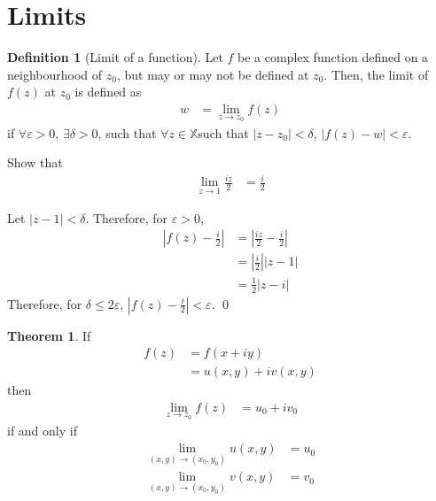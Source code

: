 \documentclass[fleqn, a4paper, 12pt, twoside]{article}
\theoremstyle{definition}
\newtheorem{definition}{Definition}
\theoremstyle{theorem}
\newtheorem{theorem}{Theorem}
\begin{document}
\section{Limits}

\begin{definition}[Limit of a function]
	Let $f$ be a complex function defined on a neighbourhood of $z_0$, but may or may not be defined at $z_0$.
	Then, the limit of $f(z)$ at $z_0$ is defined as
	\begin{align*}
		w & = \lim\limits_{z \to z_0} f(z)
	\end{align*}
	if $\forall \varepsilon > 0$, $\exists \delta > 0$, such that $\forall z \in \mathbb{X}$such that $|z - z_0| < \delta$, $\left| f(z) - w \right| < \varepsilon$.
\end{definition}

\begin{question}
	Show that
	\begin{align*}
		\lim\limits_{z \to 1} \frac{i z}{2} & = \frac{i}{2}
	\end{align*}
\end{question}

\begin{solution}
	Let $|z - 1| < \delta$.
	Therefore, for $\varepsilon > 0$,
	\begin{align*}
		\left| f(z) - \frac{i}{2} \right| & = \left| \frac{i z}{2} - \frac{i}{2} \right| \\
                                                  & = \left| \frac{i}{2} \right| |z - 1|         \\
                                                  & = \frac{1}{2} \left| z - i \right|
	\end{align*}
	Therefore, for $\delta \le 2 \varepsilon$, $\left| f(z) - \frac{i}{2} \right| < \varepsilon$.
	\qed
\end{solution}

\begin{theorem}
	If
	\begin{align*}
		f(z) & = f(x + i y) \\
                     & = u(x,y) + i v(x,y)
	\end{align*}
	then
	\begin{align*}
		\lim\limits_{z \to z_0} f(z) & = u_0 + i v_0
	\end{align*}
	if and only if
	\begin{align*}
		\lim\limits_{(x,y) \to (x_0,y_0)} u(x,y) & = u_0 \\
		\lim\limits_{(x,y) \to (x_0,y_0)} v(x,y) & = v_0
	\end{align*}
\end{theorem}
\end{document}
